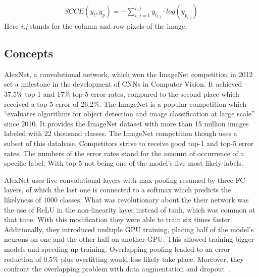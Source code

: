 \begin{align}
    SCCE(y_t,y_p) = -\sum_{i,j=1}^{i,j}y_{t_{i,j}}\cdot log(y_{p_{i,j}})
\end{align}
Here \textit{i,j} stands for the column and row pixels of the image.


\subsection{Concepts}


AlexNet, a convolutional network, which won the \gls{ImageNet} competition in 2012 set a milestone in the development
of \glspl{CNN} in Computer Vision.
It achieved 37.5\% top-1 and 17\% top-5 error rates, compared to the second place which received a top-5 error
of 26.2\%.
The \gls{ImageNet} is a popular competition which
\enquote{evaluates algorithms for object detection and image classification at large scale}~\cite{ILSVRC15}
since 2010.
It provides the ImageNet dataset with more than 15 million images labeled with 22 thousand classes.
The \gls{ImageNet} competition though uses a subset of this database.
Competitors strive to receive good top-1 and top-5 error rates.
The numbers of the error rates stand for the amount of occurrence of a specific label.
With top-5 not being one of the model's five most likely labels.

AlexNet uses five convolutional layers with max pooling resumed by three \gls{FC} layers, of which the last one
is connected to a softmax which predicts the likelyness of $1000$ classes.
What was revolutionary about the their network was the use of \gls{ReLU} in the non-linearity layer instead of tanh,
which was common at that time.
With this modification they were able to train six times faster.
Additionally, they introduced multiple GPU training, placing half of the model's neurons on one and the other half
on another GPU.
This allowed training bigger models and speeding up training.
Overlapping pooling leaded to an error reduction of 0.5\% plus overfitting would less likely take place.
Moreover, they confront the overlapping problem with data augmentation and dropout~\cite{advanceddeeplearningpython, alexnet}.

